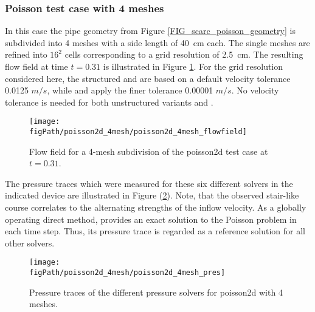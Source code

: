 \subsubsection{Poisson test case with 4 meshes}
\label{SEC_SCARC_poisson_four}

In this case the pipe geometry from Figure \ref{FIG_scarc_poisson_geometry} is subdivided into 4 meshes with a side length of 40~cm  each. The single meshes are refined into $16^2$ cells corresponding to a grid resolution of 2.5~cm. The resulting flow field at time $t=0.31$ is illustrated in Figure \ref{FIG_scarc_poisson_four_flowfield}.
%
For the grid resolution considered here, the structured \fftdefault{} and \scarcdefault{} are based on a 
default velocity tolerance 0.0125 $m/s$, while \ffttight{} and \scarctight{} apply the finer tolerance 0.00001 $m/s$.
No velocity tolerance is needed for both unstructured variants \uglmat{} and \uscarc{}. 


\begin{figure}[ht]
\begin{center}
\texttt{[image: \\figPath/poisson2d\_4mesh/poisson2d\_4mesh\_flowfield]}
\end{center}
\caption[Flow field for a 4-mesh subdivision of the poisson2d test case]{Flow field for a 4-mesh subdivision of the poisson2d test case at $t=0.31$.}
\label{FIG_scarc_poisson_four_flowfield}
\end{figure}


The pressure traces which were measured for these six different solvers in the indicated device
are illustrated in Figure (\ref{FIG_SCARC_poisson_four_trace}).
Note, that the observed stair-like course correlates to the alternating strengths of the inflow velocity.
As a globally operating direct method, \uglmat{} provides an exact solution to the Poisson problem in each time step. Thus, its pressure trace is regarded as a reference solution for all other solvers.

\begin{figure}[ht]
\begin{center}
\texttt{[image: \\figPath/poisson2d\_4mesh/poisson2d\_4mesh\_pres]}
\end{center}
\caption[Pressure traces of the different pressure solvers for {\ct poisson2d} with 4 meshes]{Pressure traces of the different pressure solvers for {\ct poisson2d} with 4 meshes. }
\label{FIG_SCARC_poisson_four_trace}
\end{figure}

